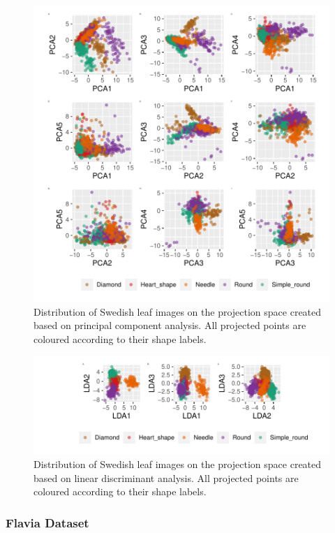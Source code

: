 \documentclass{article}
\begin{document}
\begin{figure}
\centering
\includegraphics{img/pcaswedish-1.pdf}
\caption{\label{pcaswedish}Distribution of Swedish leaf images on the
projection space created based on principal component analysis. All
projected points are coloured according to their shape labels.}
\end{figure}

\begin{figure}
\centering
\includegraphics{img/ldaswedish-1.pdf}
\caption{\label{ldaswedish}Distribution of Swedish leaf images on the
projection space created based on linear discriminant analysis. All
projected points are coloured according to their shape labels.}
\end{figure}

\hypertarget{flavia-dataset}{%
\subsubsection{Flavia Dataset}\label{flavia-dataset}}
\end{document}
